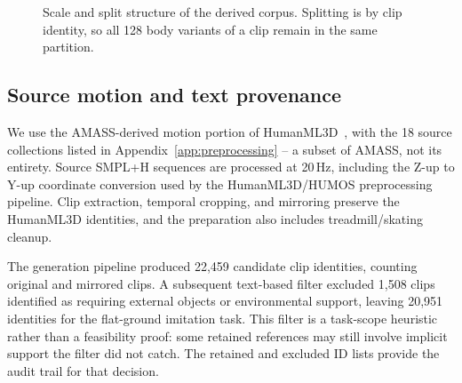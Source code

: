 \begin{figure}[t]
\centering
{}
\caption{Scale and split structure of the derived corpus. Splitting is by clip
identity, so all 128 body variants of a clip remain in the same partition.}
\label{fig:dataset_scale}
\end{figure}

\subsection{Source motion and text provenance}\label{sec:source_data}

We use the AMASS-derived motion portion of HumanML3D~\cite{amass,humanml3d}, with the 18 source collections listed in
Appendix~\ref{app:preprocessing} -- a subset of AMASS, not its entirety.
Source SMPL+H sequences are processed at 20\,Hz, including the Z-up to Y-up
coordinate conversion used by the HumanML3D/HUMOS preprocessing pipeline.
Clip extraction, temporal cropping, and mirroring preserve the HumanML3D
identities, and the preparation also includes treadmill/skating cleanup.

The generation pipeline produced 22,459 candidate clip identities, counting
original and mirrored clips. A subsequent text-based filter excluded 1,508
clips identified as requiring external objects or environmental support,
leaving 20,951 identities for the flat-ground imitation task. This filter is
a task-scope heuristic rather than a feasibility proof: some retained
references may still involve implicit support the filter did not catch. The
retained and excluded ID lists provide the audit trail for that decision.

